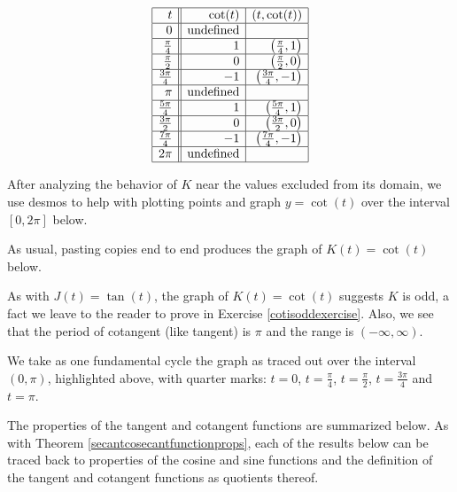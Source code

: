 \documentclass{ximera}
\begin{document}
\[ \begin{array}{|r||r|r|} \hline
t & \cot(t) & (t, \cot(t)) \\ \hline
0  & \text{undefined} &  \\ \hline
\frac{\pi}{4}  & 1 & \left(\frac{\pi}{4},1 \right) \\ \hline 
\frac{\pi}{2}  & 0 & \left(\frac{\pi}{2},0 \right)  \\ \hline 
\frac{3\pi}{4}  & -1 & \left(\frac{3\pi}{4}, -1\right) \\ \hline 
\pi & \text{undefined} &  \\ \hline 
\frac{5\pi}{4}  & 1 & \left(\frac{5\pi}{4}, 1 \right) \\ \hline 
\frac{3\pi}{2}  & 0 & \left(\frac{3\pi}{2}, 0 \right) \\ \hline 
\frac{7\pi}{4}  & -1 & \left(\frac{7\pi}{4}, -1 \right) \\ \hline 
2\pi  & \text{undefined} &  \\ \hline
\end{array} \] 


After analyzing the behavior of $K$ near the values excluded from its domain, we use desmos to help with plotting points and graph $y = \cot(t)$ over the interval $[0,2\pi]$ below. 


\begin{center}
\end{center}

As usual, pasting copies end to end produces the graph of $K(t) = \cot(t)$ below.  

\begin{center}
\end{center}

As with $J(t) = \tan(t)$, the graph of $K(t) = \cot(t)$ suggests $K$ is odd, a fact we leave to the reader to prove in Exercise \ref{cotisoddexercise}.  Also, we see that the period of cotangent (like tangent)  is $\pi$ and the range is $(-\infty, \infty)$.


We take as one fundamental cycle the graph as traced out over the interval $(0,\pi)$, highlighted above, with quarter marks:  $t= 0$, $t=\frac{\pi}{4}$, $t=\frac{\pi}{2}$, $t=\frac{3\pi}{4}$ and $t=\pi$. 


The properties of the tangent and cotangent functions are summarized below. As with Theorem \ref{secantcosecantfunctionprops}, each of the results below can be traced back to properties of the cosine and sine functions and the definition of the tangent and cotangent functions as quotients thereof. 
\end{document}
